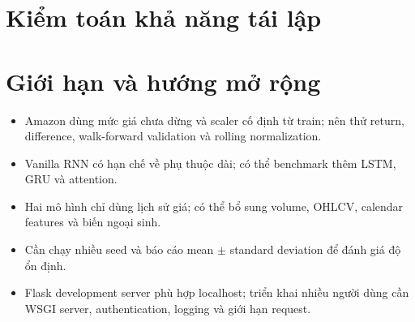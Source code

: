 \documentclass[12pt,a4paper]{report}
\begin{document}
\section{Kiểm toán khả năng tái lập}
\begin{table}[H]
\centering
\caption{Checklist tái lập Assignment 06}
\label{tab:reproducibility}
\end{table}

\section{Giới hạn và hướng mở rộng}
\begin{itemize}
    \item Amazon dùng mức giá chưa dừng và scaler cố định từ train; nên thử return, difference,
          walk-forward validation và rolling normalization.
    \item Vanilla RNN có hạn chế về phụ thuộc dài; có thể benchmark thêm LSTM, GRU và attention.
    \item Hai mô hình chỉ dùng lịch sử giá; có thể bổ sung volume, OHLCV, calendar features và biến ngoại sinh.
    \item Cần chạy nhiều seed và báo cáo mean $\pm$ standard deviation để đánh giá độ ổn định.
    \item Flask development server phù hợp localhost; triển khai nhiều người dùng cần WSGI server,
          authentication, logging và giới hạn request.
\end{itemize}
\end{document}
